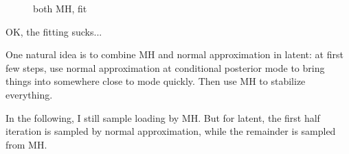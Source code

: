 \documentclass[]{article}
\begin{document}
\begin{figure}[h!]
	\caption{both MH, fit}
	\label{double MH: fit}
\end{figure}

OK, the fitting sucks...

One natural idea is to combine MH and normal approximation in latent: at first few steps, use normal approximation at conditional posterior mode to bring things into somewhere close to mode quickly. Then use MH to stabilize everything.

In the following, I still sample loading by MH. But for latent, the first half iteration is sampled by normal approximation, while the remainder is sampled from MH.
\end{document}
